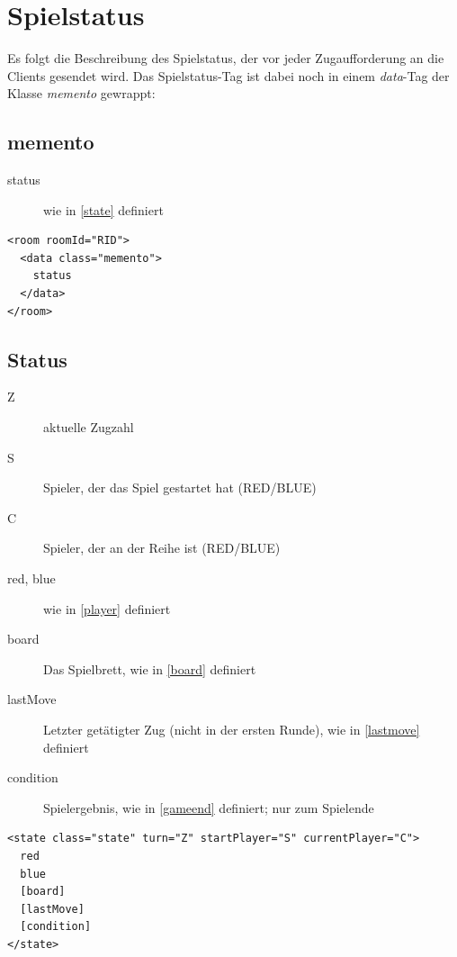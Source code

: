 \documentclass[12pt,a4paper, ngerman, oneside]{scrartcl}
\begin{document}
\section{Spielstatus}
Es folgt die Beschreibung des Spielstatus, der vor jeder Zugaufforderung an die Clients gesendet wird. Das Spielstatus-Tag ist dabei noch in einem \textit{data}-Tag der Klasse \textit{memento} gewrappt:
\subsection{memento}
\begin{description}
\item[status] wie in \ref{state} definiert
\end{description}
\begin{verbatim}
<room roomId="RID">
  <data class="memento">
  	status
  </data>
</room>
\end{verbatim}

\subsection{\label{state}Status}
\begin{description}
\item[Z] aktuelle Zugzahl
\item[S] Spieler, der das Spiel gestartet hat (RED/BLUE)
\item[C] Spieler, der an der Reihe ist (RED/BLUE)
\item[red, blue] wie in \ref{player} definiert
\item[board] Das Spielbrett, wie in \ref{board} definiert
\item[lastMove] Letzter getätigter Zug (nicht in der ersten Runde), wie in
\ref{lastmove} definiert
\item[condition] Spielergebnis, wie in \ref{gameend} definiert; nur zum Spielende
\end{description}
\begin{verbatim}
<state class="state" turn="Z" startPlayer="S" currentPlayer="C">
  red
  blue
  [board]
  [lastMove]
  [condition]
</state>

\end{verbatim}
\end{document}
